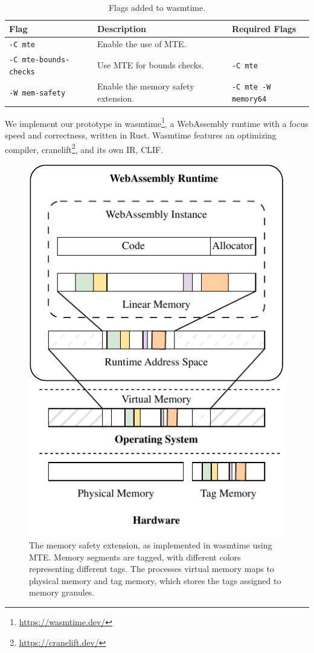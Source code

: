 \begin{table}[t]
    \centering
    \caption{Flags added to wasmtime.}
    \label{tab:wasmtime-flags}
    \begin{tabular}{l | l | l}
        \textbf{Flag}                 & \textbf{Description}                & \textbf{Required Flags}     \\
        \hline
        \texttt{-C mte}               & Enable the use of \ac{MTE}.         &                             \\
        \texttt{-C mte-bounds-checks} & Use \ac{MTE} for bounds checks.     & \texttt{-C mte}             \\
        \texttt{-W mem-safety}        & Enable the memory safety extension. & \texttt{-C mte -W memory64} \\
    \end{tabular}
\end{table}

We implement our prototype in wasmtime\footnote{\url{https://wasmtime.dev/}}, a WebAssembly runtime with a focus speed and correctness, written in Rust.
Wasmtime features an optimizing compiler, cranelift\footnote{\url{https://cranelift.dev/}}, and its own \ac{IR}, \ac{CLIF}.

\begin{figure}[t]
    \centering
    \includegraphics[scale=1]{figures/build/system-design-2}
    \caption{The memory safety extension, as implemented in wasmtime using \ac{MTE}. Memory segments are tagged, with different colors representing different tags. The processes virtual memory maps to physical memory and tag memory, which stores the tags assigned to memory granules.}
    \label{fig:wasmtime-mte-impl}
\end{figure}

